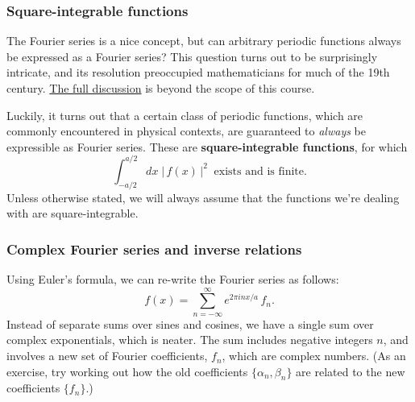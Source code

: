 \documentclass[10pt,a4paper]{article}
\begin{document}
\subsubsection{Square-integrable functions}
\label{square-integrable-functions}

The Fourier series is a nice concept, but can arbitrary periodic
functions always be expressed as a Fourier series? This question turns
out to be surprisingly intricate, and its resolution preoccupied
mathematicians for much of the 19th century.
\href{http://en.wikipedia.org/wiki/Convergence_of_Fourier_series}{The
full discussion} is beyond the scope of this course.

Luckily, it turns out that a certain class of periodic functions, which
are commonly encountered in physical contexts, are guaranteed to
\emph{always} be expressible as Fourier series. These are
\textbf{square-integrable functions}, for which
\begin{equation}
\int_{-a/2}^{a/2} dx\; \big|\,f(x)\,\big|^2\;\;\text{exists and is finite}.
\end{equation}
Unless otherwise stated, we will always assume that the functions we're
dealing with are square-integrable.

\subsubsection{Complex Fourier series and inverse relations}
\label{complex-fourier-series-and-inverse-relations}

Using Euler's formula, we can re-write the Fourier series as follows:
\begin{equation}
f(x) = \sum_{n=-\infty}^\infty e^{2\pi i n x/a}\, f_n.
\end{equation}
Instead of separate sums over sines and cosines, we have a single sum
over complex exponentials, which is neater. The sum includes negative
integers $n$, and involves a new set of Fourier coefficients, $f_n$,
which are complex numbers.  (As an exercise, try working out how the
old coefficients $\{\alpha_n, \beta_n\}$ are related to the new
coefficients $\{f_n\}$.)
\end{document}
